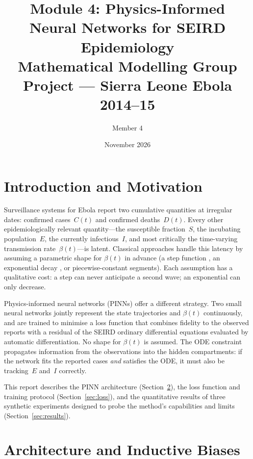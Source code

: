 \documentclass[11pt,a4paper]{article}
\title{\textbf{Module 4: Physics-Informed Neural Networks for SEIRD Epidemiology}\\[4pt]
       {\large Mathematical Modelling Group Project --- Sierra Leone Ebola 2014--15}}
\author{Member 4}
\date{November 2026}
\theoremstyle{remark}
\begin{document}
\maketitle
\thispagestyle{empty}

\section{Introduction and Motivation}

Surveillance systems for Ebola report two cumulative quantities at irregular
dates: confirmed cases~$C(t)$ and confirmed deaths~$D(t)$.  Every other
epidemiologically relevant quantity---the susceptible fraction~$S$, the
incubating population~$E$, the currently infectious~$I$, and most critically
the time-varying transmission rate~$\beta(t)$---is latent.  Classical
approaches handle this latency by assuming a parametric shape for $\beta(t)$
in advance (a step function \cite{rivers2014ebola}, an exponential decay
\cite{althaus2014estimating}, or piecewise-constant segments).  Each
assumption has a qualitative cost: a step can never anticipate a second wave;
an exponential can only decrease.

Physics-informed neural networks (PINNs) \cite{raissi2019physics} offer a
different strategy.  Two small neural networks jointly represent the state
trajectories and $\beta(t)$ continuously, and are trained to minimise a loss
function that combines fidelity to the observed reports with a residual of the
SEIRD ordinary differential equations evaluated by automatic differentiation.
No shape for $\beta(t)$ is assumed.  The ODE constraint propagates information
from the observations into the hidden compartments: if the network fits the
reported cases \emph{and} satisfies the ODE, it must also be tracking~$E$
and~$I$ correctly.

This report describes the PINN architecture (Section~\ref{sec:arch}), the
loss function and training protocol (Section~\ref{sec:loss}), and the
quantitative results of three synthetic experiments designed to probe the
method's capabilities and limits (Section~\ref{sec:results}).

\section{Architecture and Inductive Biases}
\label{sec:arch}
\end{document}
